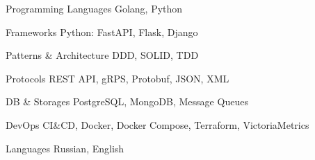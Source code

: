 

\begin{cvskills}

  \cvskill
    {Programming Languages} %
    {Golang, Python} %

  \cvskill
    {Frameworks} %
    {Python: FastAPI, Flask, Django} %

  \cvskill
    {Patterns \& Architecture} %
    {DDD, SOLID, TDD} %

  \cvskill
    {Protocols} %
    {REST API, gRPS, Protobuf, JSON, XML} %

  \cvskill
    {DB \& Storages} %
    {PostgreSQL, MongoDB, Message Queues} %

  \cvskill
    {DevOps} %
    {CI\&CD, Docker, Docker Compose, Terraform, VictoriaMetrics} %

  \cvskill
    {Languages} %
    {Russian, English} %

\end{cvskills}
